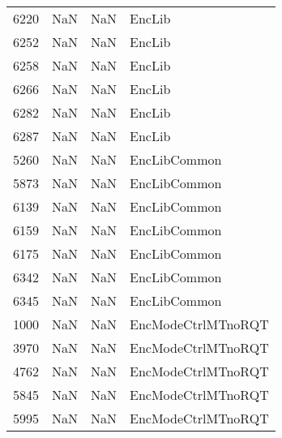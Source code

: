 \begin{tabular}{llll}
6220 &                   NaN &                        NaN &                                    EncLib \\
6252 &                   NaN &                        NaN &                                    EncLib \\
6258 &                   NaN &                        NaN &                                    EncLib \\
6266 &                   NaN &                        NaN &                                    EncLib \\
6282 &                   NaN &                        NaN &                                    EncLib \\
6287 &                   NaN &                        NaN &                                    EncLib \\
5260 &                   NaN &                        NaN &                              EncLibCommon \\
5873 &                   NaN &                        NaN &                              EncLibCommon \\
6139 &                   NaN &                        NaN &                              EncLibCommon \\
6159 &                   NaN &                        NaN &                              EncLibCommon \\
6175 &                   NaN &                        NaN &                              EncLibCommon \\
6342 &                   NaN &                        NaN &                              EncLibCommon \\
6345 &                   NaN &                        NaN &                              EncLibCommon \\
1000 &                   NaN &                        NaN &                        EncModeCtrlMTnoRQT \\
3970 &                   NaN &                        NaN &                        EncModeCtrlMTnoRQT \\
4762 &                   NaN &                        NaN &                        EncModeCtrlMTnoRQT \\
5845 &                   NaN &                        NaN &                        EncModeCtrlMTnoRQT \\
5995 &                   NaN &                        NaN &                        EncModeCtrlMTnoRQT \\

\end{tabular}
